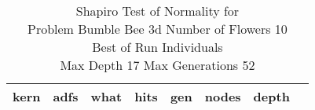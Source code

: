 \begin{table}[H]
\caption{Shapiro Test of Normality for \\ Problem  Bumble Bee 3d  Number of Flowers 10\\Best of Run Individuals \\ Max Depth 17 Max Generations 52\\}
\begin{center}
\scalebox{0.8} %
{
\begin{tabular}{lrrrrrrr}
\hline
kern & adfs & what & hits & gen & nodes & depth \\
\hline


\end{tabular}
}
\end{center}
\end{table}

